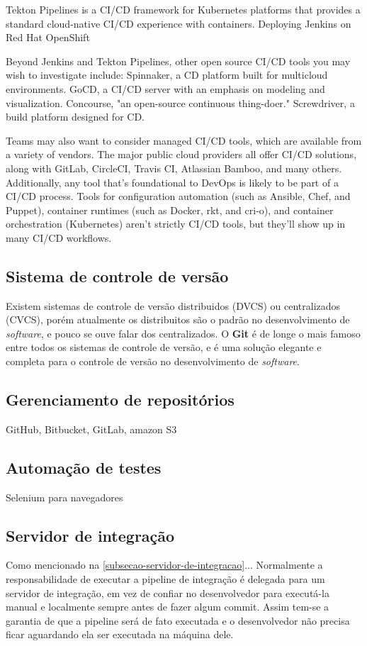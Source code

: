 Tekton Pipelines is a CI/CD framework for Kubernetes platforms that provides a standard cloud-native CI/CD experience with containers.
Deploying Jenkins on Red Hat OpenShift

Beyond Jenkins and Tekton Pipelines, other open source CI/CD tools you may wish to investigate include:
    Spinnaker, a CD platform built for multicloud environments.
    GoCD, a CI/CD server with an emphasis on modeling and visualization.
    Concourse, "an open-source continuous thing-doer."
    Screwdriver, a build platform designed for CD.

Teams may also want to consider managed CI/CD tools, which are available from a variety of vendors. The major public cloud providers all offer CI/CD solutions, along with GitLab, CircleCI, Travis CI, Atlassian Bamboo, and many others.
Additionally, any tool that’s foundational to DevOps is likely to be part of a CI/CD process. Tools for configuration automation (such as Ansible, Chef, and Puppet), container runtimes (such as Docker, rkt, and cri-o), and container orchestration (Kubernetes) aren’t strictly CI/CD tools, but they’ll show up in many CI/CD workflows. \cite{redhat-ci-cd}

\subsection{Sistema de controle de versão}
Existem sistemas de controle de versão distribuidos (DVCS) ou centralizados (CVCS), porém atualmente os distribuitos são o padrão no desenvolvimento de \emph{software}, e pouco se ouve falar dos centralizados. O \textbf{Git} é de longe o mais famoso entre todos os sistemas de controle de versão, e é uma solução elegante e completa para o controle de versão no desenvolvimento de \emph{software}.

\subsection{Gerenciamento de repositórios}
GitHub, Bitbucket, GitLab, amazon S3

\subsection{Automação de testes}
Selenium para navegadores

\subsection{Servidor de integração}
Como mencionado na \autoref{subsecao-servidor-de-integracao}... Normalmente a responsabilidade de executar a pipeline de integração é delegada para um servidor de integração, em vez de confiar no desenvolvedor para executá-la manual e localmente sempre antes de fazer algum commit. Assim tem-se a garantia de que a pipeline será de fato executada e o desenvolvedor não precisa ficar aguardando ela ser executada na máquina dele.

